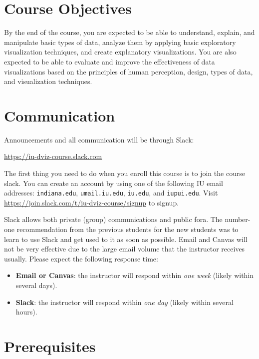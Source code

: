 \documentclass[11pt,article,oneside]{memoir} %
\begin{document}
\section{Course Objectives}%

By the end of the course, you are expected to be able to understand, explain, and manipulate basic types of data, analyze them by applying basic exploratory visualization techniques, and create explanatory visualizations. 
You are also expected to be able to evaluate and improve the effectiveness of data visualizations based on the principles of human perception, design, types of data, and visualization techniques. 
 

\section{Communication} %

Announcements and all communication will be through Slack: 

\url{https://iu-dviz-course.slack.com}

The first thing you need to do when you enroll this course is to join the course slack. You can create an account by using one of the following IU email addresses: \texttt{indiana.edu}, \texttt{umail.iu.edu}, \texttt{iu.edu}, and \texttt{iupui.edu}. Visit \url{https://join.slack.com/t/iu-dviz-course/signup} to signup.

Slack allows both private (group) communications and public fora. The number-one recommendation from the previous students for the new students was to learn to use Slack and get used to it as soon as possible. Email and Canvas will not be very effective due to the large email volume that the instructor receives usually. Please expect the following response time:

\begin{itemize}
\item \textbf{Email or Canvas}: the instructor will respond within \emph{one week} (likely within several days).
\item \textbf{Slack}: the instructor will respond within \emph{one day} (likely within several hours).

\end{itemize}

\section{Prerequisites}%
\label{sec:Prerequisites}
\end{document}

